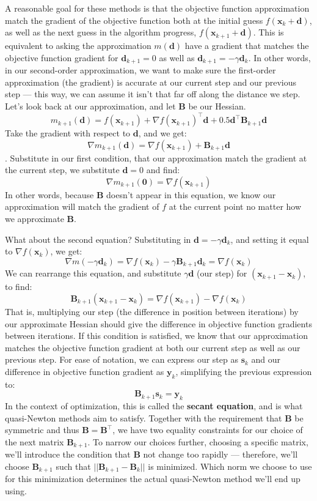 \documentclass[12pt]{article}
\begin{document}
A reasonable goal for these methods is that the objective function approximation match the gradient of the objective function both
at the initial guess \(f(\mathbf{x}_k + \mathbf{d})\), as well as the next guess in the algorithm progress, 
\(f(\mathbf{x}_{k+1} + \mathbf{d})\). This is equivalent to asking the approximation \(m(\mathbf{d})\) have a gradient
that matches the objective function gradient for \(\mathbf{d}_{k+1} = 0\) as well as \(\mathbf{d}_{k+1} = - \gamma \mathbf{d}_k\). In other words, in
our second-order approximation, we want to make sure the first-order approximation (the gradient) is accurate at our current step
and our previous step --- this way, we can assume it isn't that far off along the distance we step. Let's look back at our approximation, 
and let \(\mathbf{B}\) be our Hessian.
\[m_{k+1}(\mathbf{d}) = f(\mathbf{x}_{k+1}) + \nabla f(\mathbf{x}_{k+1})^\top \mathbf{d} + 0.5 \mathbf{d}^\top \mathbf{B}_{k+1} \mathbf{d}\]
Take the gradient with respect to \(\mathbf{d}\), and we get:
\[\nabla m_{k+1}(\mathbf{d}) = \nabla f(\mathbf{x}_{k+1}) + \mathbf{B}_{k+1} \mathbf{d}\].
Substitute in our first condition, that our approximation match the gradient at the current step, we substitute \(\mathbf{d} = 0\) and find:
\[\nabla m_{k+1}(\mathbf{0}) = \nabla f(\mathbf{x}_{k+1})\]
In other words, because \(\mathbf{B}\) doesn't appear in this equation, we know
our approximation will match the gradient of \(f\) at the current point no matter how we approximate \(\mathbf{B}\). 

What about the second equation? Substituting in \(\mathbf{d} = - \gamma \mathbf{d}_k\), 
and setting it equal to \(\nabla f(\mathbf{x}_k)\), we get:
\[\nabla m(-\gamma \mathbf{d}_{k}) = \nabla f(\mathbf{x}_k) - \gamma \mathbf{B}_{k+1} \mathbf{d}_{k} = \nabla f(\mathbf{x}_k)\]
We can rearrange this equation, and substitute \(\gamma \mathbf{d}\) (our step) for \((\mathbf{x}_{k+1} - \mathbf{x}_k)\), to find:
\[\mathbf{B}_{k+1} (\mathbf{x}_{k+1} - \mathbf{x}_k) = \nabla f(\mathbf{x}_{k+1}) - \nabla f(\mathbf{x}_k)\]
That is, multiplying our step (the difference in position between iterations) by our approximate Hessian should give the difference in
objective function gradients between iterations. If this condition is satisfied, we know that our approximation matches the objective function
gradient at both our current step as well as our previous step. For ease of notation, we can express our step as \(\mathbf{s}_k\) and our difference
in objective function gradient as \(\mathbf{y}_k\), simplifying the previous expression to:
\[\mathbf{B}_{k+1} \mathbf{s}_k = \mathbf{y}_k\]
In the context of optimization, this is called the \textbf{secant equation}, and is what quasi-Newton methods aim to satisfy.
Together with the requirement that \(\mathbf{B}\) be symmetric and thus \(\mathbf{B} = \mathbf{B}^\top\), we have two equality constraints
for our choice of the next matrix \(\mathbf{B}_{k+1}\). To narrow our choices further, choosing a specific matrix, we'll introduce the condition
that \(\mathbf{B}\) not change too rapidly --- therefore, we'll choose \(\mathbf{B}_{k+1}\) such that 
\(||\mathbf{B}_{k+1} - \mathbf{B}_k||\) is minimized. Which norm we choose to use for this minimization determines the actual quasi-Newton method
we'll end up using.
\end{document}
